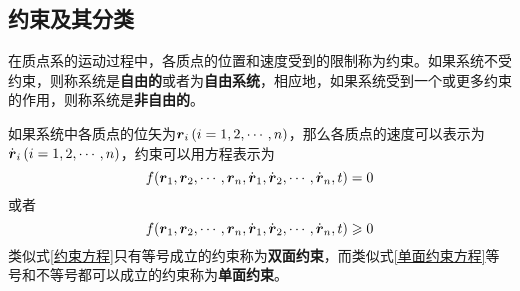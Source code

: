 \subsection{约束及其分类}

在质点系的运动过程中，各质点的位置和速度受到的限制称为{\heiti 约束}。如果系统不受约束，则称系统是{\bf 自由的}或者为{\bf 自由系统}，相应地，如果系统受到一个或更多约束的作用，则称系统是{\bf 非自由的}。

如果系统中各质点的位矢为$\boldsymbol{r}_i\,(i=1,2,\cdots,n)$，那么各质点的速度可以表示为$\dot{\boldsymbol{r}}_i\,(i=1,2,\cdots,n)$，约束可以用方程表示为
\begin{equation}
	f(\boldsymbol{r}_1,\boldsymbol{r}_2,\cdots,\boldsymbol{r}_n,\dot{\boldsymbol{r}}_1,\dot{\boldsymbol{r}}_2,\cdots,\dot{\boldsymbol{r}}_n,t) = 0
	\label{约束方程}
\end{equation}
或者
\begin{equation}
	f(\boldsymbol{r}_1,\boldsymbol{r}_2,\cdots,\boldsymbol{r}_n,\dot{\boldsymbol{r}}_1,\dot{\boldsymbol{r}}_2,\cdots,\dot{\boldsymbol{r}}_n,t) \geqslant 0
	\label{单面约束方程}
\end{equation}
类似式\eqref{约束方程}只有等号成立的约束称为{\bf 双面约束}，而类似式\eqref{单面约束方程}等号和不等号都可以成立的约束称为{\bf 单面约束}。

